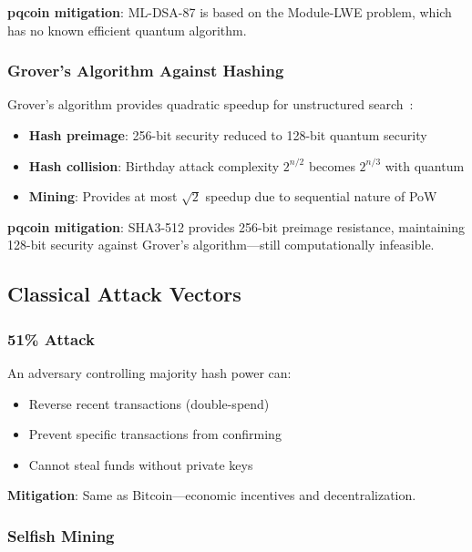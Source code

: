 \documentclass[11pt,a4paper]{article}
\begin{document}
\textbf{pqcoin mitigation}: ML-DSA-87 is based on the Module-LWE problem, which has no known efficient quantum algorithm.

\subsubsection{Grover's Algorithm Against Hashing}

Grover's algorithm provides quadratic speedup for unstructured search~\cite{grover1996}:

\begin{itemize}
    \item \textbf{Hash preimage}: 256-bit security reduced to 128-bit quantum security
    \item \textbf{Hash collision}: Birthday attack complexity $2^{n/2}$ becomes $2^{n/3}$ with quantum
    \item \textbf{Mining}: Provides at most $\sqrt{2}$ speedup due to sequential nature of PoW
\end{itemize}

\textbf{pqcoin mitigation}: SHA3-512 provides 256-bit preimage resistance, maintaining 128-bit security against Grover's algorithm---still computationally infeasible.

\subsection{Classical Attack Vectors}

\subsubsection{51\% Attack}

An adversary controlling majority hash power can:
\begin{itemize}
    \item Reverse recent transactions (double-spend)
    \item Prevent specific transactions from confirming
    \item Cannot steal funds without private keys
\end{itemize}

\textbf{Mitigation}: Same as Bitcoin---economic incentives and decentralization.

\subsubsection{Selfish Mining}
\end{document}
